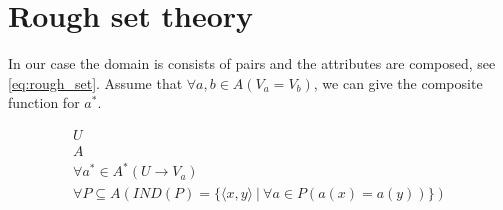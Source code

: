 \documentclass[11pt,a4paper,notitlepage,onecolumn,twoside]{article}
\newtheorem{definition}{Definition}
\begin{document}
\begin{comment}
\begin{definition}[Indiscernability]
\begin{equation}
f_{\mathbb{I}}([x]_{\approx}) =
  \langle
    \bigcap_{y \in G_{[x]_{\approx}}} f^{+}_{\mathbb{P}}(y),
    \bigcap_{y \in G_{[x]_{\approx}}} f^{-}_{\mathbb{P}}(y)
  \rangle
\end{equation}
\end{definition}

What is special about this approach is that we define (in)discernability on
the level of equivalence sets over individuals,
where normally this is defined on the level of individuals.

Observe that we are not talking about sets of indiscernable instances
(as in traditional approaches towards identity),
but about \emph{indiscernability descriptions}
(in terms of domain properties).
This means that $[x]_f([x]_{\approx}) = [x]_{\approx}$ is not true for the
general case. So for each group there can be instances in $[x]_{\approx}$
but not in $G_{[x]_{\approx}}$
(depending on the similarity strictures chosen).
But there can also be instances in $G_{[x]_{\approx}}$ that are not in
$[x]_{\approx}$.

\begin{definition}
\begin{equation}
\approx' = \{ \langle x, y \rangle \in \mathbb{U}^2 \  \vert \ 
    \forall P \in i_1(f_{\mathbb{I}}([x]_{\approx})), \exists z (xPz \leftrightarrow yPz) \}
\end{equation}
\end{definition}
\end{comment}





\section{Rough set theory}
\label{sec:rough_set_theory}

In our case the domain is consists of pairs and the attributes are composed, see \ref{eq:rough_set}. Assume that $\forall a,b \in A (V_a = V_b)$, we can give the composite function for $a^*$.

\begin{align}
\label{eq:rough_set_classic}
U \\
A \\
\forall a^* \in A^* (U \rightarrow V_a) \\
\forall P \subseteq A (
    IND(P) = \{
      \langle x, y \rangle
    \  \vert \ 
      \forall a \in P (a(x) = a(y))
    \}
  )
\end{align}
\end{document}
